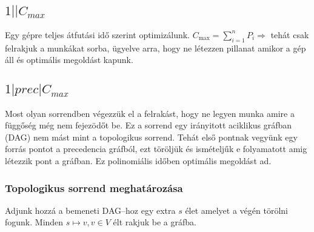 \subsection{ \texorpdfstring {$ 1||C_{max} $} {1||Cmax} }

Egy gépre teljes átfutási idő szerint optimizálunk. $C_{\mbox{max}}=\sum_{i=1}^{n}
P_i \Rightarrow$ tehát csak felrakjuk a munkákat sorba, ügyelve arra, hogy ne 
létezzen pillanat amikor a gép áll és optimális megoldást kapunk.

\subsection{ \texorpdfstring {$ 1|prec|C_{max} $} {1|prec|Cmax} }

Most olyan sorrendben végezzük el a felrakást, hogy ne legyen munka amire a
függőség még nem fejezödőt be. Ez a sorrend egy irányitott aciklikus gráfban
(DAG) nem mást mint a topologikus sorrend. Tehát első pontnak vegyünk egy forrás
pontot a precedencia gráfból, ezt töröljük és ismételjűk e folyamatott amig
létezzik pont a gráfban. Ez polinomiális időben optimális megoldást ad.

\subsubsection{Topologikus sorrend meghatározása}

Adjunk hozzá a bemeneti DAG--hoz egy extra $s$ élet amelyet a végén törölni 
fogunk. Minden $s \mapsto v, v \in V$ élt rakjuk be a gráfba.